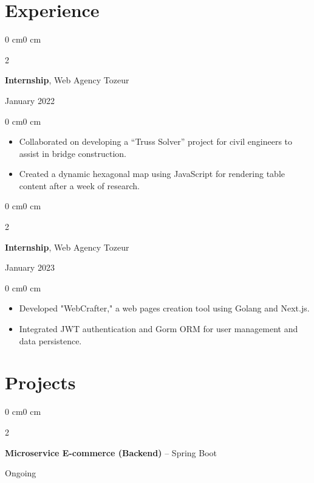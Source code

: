 \documentclass[10pt, letterpaper]{article}
\newenvironment{highlights}{
    \begin{itemize}[
        topsep=0.10 cm,
        parsep=0.10 cm,
        partopsep=0pt,
        itemsep=0pt,
        leftmargin=0 cm + 10pt
    ]
}{
    \end{itemize}
}
\newenvironment{onecolentry}{
    \begin{adjustwidth}{0 cm}{0 cm}
}{
    \end{adjustwidth}
}
\newenvironment{twocolentry}[2][]{
    \onecolentry
    \def\secondColumn{#2}
    \setcolumnwidth{\fill, 4.5 cm}
    \begin{paracol}{2}
}{
    \switchcolumn \raggedleft \secondColumn
    \end{paracol}
    \endonecolentry
}
\begin{document}
\vspace{0.5 cm}

\section{Experience}
\begin{twocolentry}{January 2022}
    \textbf{Internship}, Web Agency Tozeur
\end{twocolentry}

\vspace{0.10 cm}
\begin{onecolentry}
    \begin{highlights}
        \item Collaborated on developing a “Truss Solver” project for civil engineers to assist in bridge construction.
        \item Created a dynamic hexagonal map using JavaScript for rendering table content after a week of research.
    \end{highlights}
\end{onecolentry}

\vspace{0.2 cm}

\begin{twocolentry}{January 2023}
    \textbf{Internship}, Web Agency Tozeur
\end{twocolentry}

\vspace{0.10 cm}
\begin{onecolentry}
    \begin{highlights}
        \item Developed "WebCrafter," a web pages creation tool using Golang and Next.js.
        \item Integrated JWT authentication and Gorm ORM for user management and data persistence.
    \end{highlights}
\end{onecolentry}

\vspace{0.5 cm}

\section{Projects}

\begin{twocolentry}{Ongoing}
    \textbf{Microservice E-commerce (Backend)} -- Spring Boot
\end{twocolentry}
\end{document}
